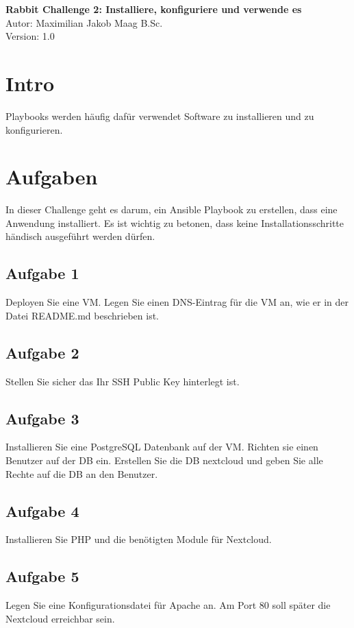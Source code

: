 \documentclass{article}
\begin{document}
    \begin{center}
        \Large \textbf{Rabbit Challenge 2: Installiere, konfiguriere und verwende es} \\ [6pt]
        \normalsize
        Autor: Maximilian Jakob Maag B.Sc. \\
        Version: 1.0
    \end{center}

    \section{Intro}
    Playbooks werden häufig dafür verwendet Software zu installieren und zu konfigurieren.

    \section{Aufgaben}
    In dieser Challenge geht es darum, ein Ansible Playbook zu erstellen, dass eine Anwendung installiert.
    Es ist wichtig zu betonen, dass keine Installationsschritte händisch ausgeführt werden dürfen.

    \subsection{Aufgabe 1}
    Deployen Sie eine VM. Legen Sie einen DNS-Eintrag für die VM an, wie er in der Datei README.md beschrieben ist.

    \subsection{Aufgabe 2}
    Stellen Sie sicher das Ihr SSH Public Key hinterlegt ist.

    \subsection{Aufgabe 3}
    Installieren Sie eine PostgreSQL Datenbank auf der VM.
    Richten sie einen Benutzer auf der DB ein. Erstellen Sie die DB nextcloud und
    geben Sie alle Rechte auf die DB an den Benutzer.

    \subsection{Aufgabe 4}
    Installieren Sie PHP und die benötigten Module für Nextcloud.

    \subsection{Aufgabe 5}
    Legen Sie eine Konfigurationsdatei für Apache an.
    Am Port 80 soll später die Nextcloud erreichbar sein.
\end{document}
